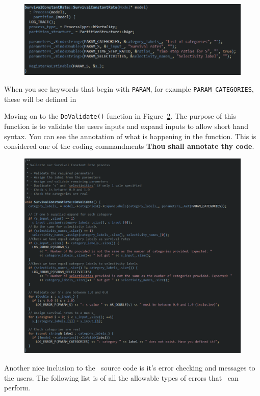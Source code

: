 \begin{figure}[!ht]
	\centering
	\includegraphics[scale=0.8]{Figures/constructor.png}
	\caption{}\label{fig:constructor}
\end{figure}
When you see keywords that begin with \texttt{PARAM}, for example \texttt{PARAM\_CATEGORIES}, these will be defined in 

Moving on to the \texttt{DoValidate()} function in Figure~\ref{fig:validate}. The purpose of this function is to validate the users inputs and expand inputs to allow short hand syntax. You can see the annotation of what is happening in the function. This is considered one of the coding commandments \textbf{Thou shall annotate thy code}.
\begin{figure}[!ht]
	\centering
	\includegraphics[scale=0.7]{Figures/validate.png}
	\caption{}\label{fig:validate}
\end{figure}

Another nice inclusion to the \CNAME\ source code is it's error checking and messages to the users. The following list is of all the allowable types of errors that \CNAME\ can perform.

